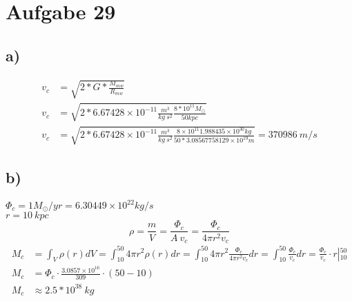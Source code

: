 \section{Aufgabe 29}
\subsection{a)}

\begin{align}
v_{c} &= \sqrt{2*G*\frac{M_{mw}}{R_{mw}}}\nonumber\\
v_{c} &= \sqrt{2*6.67428 \times 10^{-11} \frac{m^3}{kg ~ s^2}  \frac{8*10^{11} M_{\odot}}{50 kpc}}\nonumber\\
v_{c} &= \sqrt{2*6.67428 \times 10^{-11} \frac{m^3}{kg ~ s^2}  \frac{8 \times 10^{11} 1.988435 \times 10^{30} kg}{50*3.08567758129 \times 10^{19} m}} = 370986~m/s
\end{align}

\subsection{b)}
\(\Phi_{c} = 1M_\odot/yr = 6.30449\times 10^{22} kg/s\)\\
\(r=10~kpc\)
\begin{equation}
\rho = \frac{m}{V} = \frac{\Phi_{c}}{A~v_{c}} = \frac{\Phi_{c}}{4\pi r^2 v_{c}}
\end{equation}
\begin{align}
M_{c} &= \int_{V} \rho(r)dV = \int_{10}^{50} 4 \pi r^2 \rho(r) dr = \int_{10}^{50} 4 \pi r^2 \frac{\Phi_{c}}{4\pi r^2 v_{c}} dr = \int_{10}^{50} \frac{\Phi_{c}}{v_{c}} dr = \frac{\Phi_{c}}{v_{c}}\cdot r \left |_{10}^{50}\right.\nonumber\\
M_{c}&= \Phi_{c}\cdot \frac{3.0857\times 10^{16}}{309}\cdot(50-10)\nonumber\\
M_{c}&\approx 2.5 * 10^{38}~kg
\end{align}
